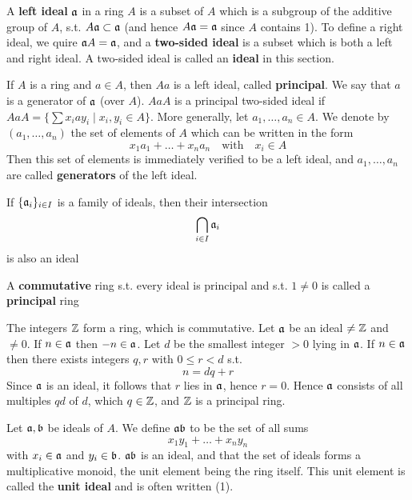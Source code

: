 \documentclass[11pt]{article}
\begin{document}
A \textbf{left ideal} \(\mathfrak{a}\) in a ring \(A\) is a subset of \(A\) which is a subgroup of the additive group
of \(A\), s.t. \(A\mathfrak{a}\subset\mathfrak{a}\) (and hence \(A\mathfrak{a}=\mathfrak{a}\) since \(A\) contains 1). To define a right ideal, we
quire \(\mathfrak{a} A=\mathfrak{a}\), and a \textbf{two-sided ideal} is a subset which is both a left and right ideal. A
two-sided ideal is called an \textbf{ideal} in this section.

If \(A\) is a ring and \(a\in A\), then \(Aa\) is a left ideal, called \textbf{principal}. We say that \(a\)
is a generator of \(\mathfrak{a}\) (over \(A\)). \(AaA\) is a principal two-sided ideal
if \(AaA=\{\sum x_iay_i\mid x_i,y_i\in A\}\). More generally, let \(a_1,\dots,a_n\in A\). We denote by \((a_1,\dots,a_n)\)
the set of elements of \(A\) which can be written in the form
\begin{equation*}
x_1a_1+\dots+x_na_n\quad\text{with}\quad x_i\in A
\end{equation*}
Then this set of elements is immediately verified to be a left ideal, and \(a_1,\dots,a_n\) are called
\textbf{generators} of the left ideal.

If \(\{\mathfrak{a}_i\}_{i\in I}\) is a family of ideals, then their intersection
\begin{equation*}
\bigcap_{i\in I}\mathfrak{a}_i
\end{equation*}
is also an ideal

A \textbf{commutative} ring s.t. every ideal is principal and s.t. \(1\neq 0\) is called a \textbf{principal} ring

\begin{examplle}[]
The integers \(\mathbb{Z}\) form a ring, which is commutative. Let \(\mathfrak{a}\) be an ideal \(\neq\mathbb{Z}\) and \(\neq 0\).
If \(n\in\mathfrak{a}\) then \(-n\in\mathfrak{a}\). Let \(d\) be the smallest integer \(>0\) lying in \(\mathfrak{a}\). If \(n\in\mathfrak{a}\)
then there exists integers \(q,r\) with \(0\le r<d\) s.t.
\begin{equation*}
n=dq+r
\end{equation*}
Since \(\mathfrak{a}\) is an ideal, it follows that \(r\) lies in \(\mathfrak{a}\), hence \(r=0\). Hence \(\mathfrak{a}\) consists
of all multiples \(qd\) of \(d\), which \(q\in\mathbb{Z}\), and \(\mathbb{Z}\) is a principal ring.
\end{examplle}

Let \(\mathfrak{a},\mathfrak{b}\) be ideals of \(A\). We define \(\mathfrak{a}\mathfrak{b}\) to be the set of all sums
\begin{equation*}
x_1y_1+\dots+x_ny_n
\end{equation*}
with \(x_i\in\mathfrak{a}\) and \(y_i\in\mathfrak{b}\). \(\mathfrak{a}\mathfrak{b}\) is an ideal, and that the set of ideals forms a multiplicative
monoid, the unit element being the ring itself. This unit element is called the \textbf{unit ideal} and is
often written (1).
\end{document}
